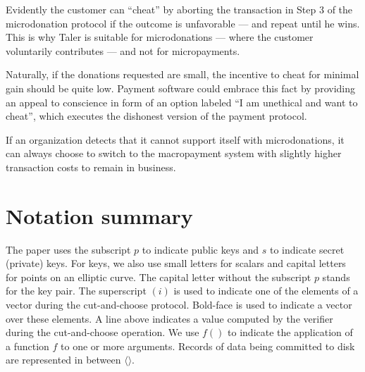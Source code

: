 \documentclass{llncs}
\begin{document}
Evidently the customer can ``cheat'' by aborting the transaction in
Step 3 of the microdonation protocol if the outcome is unfavorable ---
and repeat until he wins.  This is why Taler is suitable for
microdonations --- where the customer voluntarily contributes ---
and not for micropayments.

Naturally, if the donations requested are small, the incentive to
cheat for minimal gain should be quite low.  Payment software could
embrace this fact by providing an appeal to conscience in form of an
option labeled ``I am unethical and want to cheat'', which executes
the dishonest version of the payment protocol.

If an organization detects that it cannot support itself with
microdonations, it can always choose to switch to the macropayment
system with slightly higher transaction costs to remain in business.

\newpage
\section{Notation summary}

The paper uses the subscript $p$ to indicate public keys and $s$ to
indicate secret (private) keys.  For keys, we also use small letters
for scalars and capital letters for points on an elliptic curve.  The
capital letter without the subscript $p$ stands for the key pair.  The
superscript $(i)$ is used to indicate one of the elements of a vector
during the cut-and-choose protocol.  Bold-face is used to indicate a
vector over these elements.  A line above indicates a value computed
by the verifier during the cut-and-choose operation.  We use $f()$ to
indicate the application of a function $f$ to one or more arguments. Records of
data being committed to disk are represented in between $\langle\rangle$.
\end{document}

